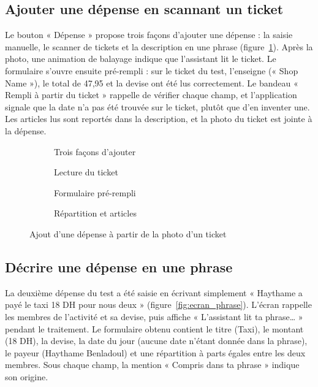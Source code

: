 \subsection{Ajouter une dépense en scannant un ticket}

Le bouton « Dépense » propose trois façons d'ajouter une dépense : la saisie manuelle, le
scanner de tickets et la description en une phrase (figure~\ref{fig:ecran_scan}). Après la
photo, une animation de balayage indique que l'assistant lit le ticket. Le formulaire
s'ouvre ensuite pré-rempli : sur le ticket du test, l'enseigne (« Shop Name »), le total de
47,95 et la devise ont été lus correctement. Le bandeau « Rempli à partir du ticket »
rappelle de vérifier chaque champ, et l'application signale que la date n'a pas été trouvée
sur le ticket, plutôt que d'en inventer une. Les articles lus sont reportés dans la
description, et la photo du ticket est jointe à la dépense.

\begin{figure}[H]
\centering
\begin{subfigure}[t]{0.235\textwidth}\centering{}\caption{Trois façons d'ajouter}\end{subfigure}\hfill
\begin{subfigure}[t]{0.235\textwidth}\centering{}\caption{Lecture du ticket}\end{subfigure}\hfill
\begin{subfigure}[t]{0.235\textwidth}\centering{}\caption{Formulaire pré-rempli}\end{subfigure}\hfill
\begin{subfigure}[t]{0.235\textwidth}\centering{}\caption{Répartition et articles}\end{subfigure}
\caption{Ajout d'une dépense à partir de la photo d'un ticket}
\label{fig:ecran_scan}
\end{figure}

\subsection{Décrire une dépense en une phrase}

La deuxième dépense du test a été saisie en écrivant simplement « Haythame a payé le taxi
18 DH pour nous deux » (figure~\ref{fig:ecran_phrase}). L'écran rappelle les membres de
l'activité et sa devise, puis affiche « L'assistant lit ta phrase… » pendant le traitement.
Le formulaire obtenu contient le titre (Taxi), le montant (18 DH), la devise, la date du jour
(aucune date n'étant donnée dans la phrase), le payeur (Haythame Benladoul) et une
répartition à parts égales entre les deux membres. Sous chaque champ, la mention « Compris
dans ta phrase » indique son origine.

